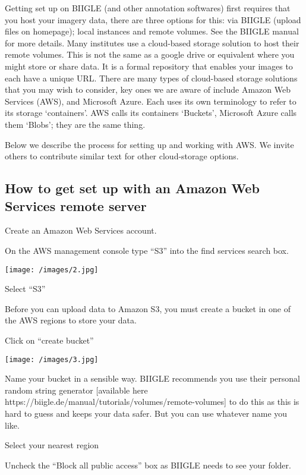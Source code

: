 \documentclass[
  letterpaper,
  DIV=11,
  numbers=noendperiod]{scrartcl}
\begin{document}
Getting set up on BIIGLE (and other annotation softwares) first requires
that you host your imagery data, there are three options for this: via
BIIGLE (upload files on homepage); local instances and remote volumes.
See the BIIGLE manual for more details. Many institutes use a
cloud-based storage solution to host their remote volumes. This is not
the same as a google drive or equivalent where you might store or share
data. It is a formal repository that enables your images to each have a
unique URL. There are many types of cloud-based storage solutions that
you may wish to consider, key ones we are aware of include Amazon Web
Services (AWS), and Microsoft Azure. Each uses its own terminology to
refer to its storage `containers'. AWS calls its containers `Buckets',
Microsoft Azure calls them `Blobs'; they are the same thing.

Below we describe the process for setting up and working with AWS. We
invite others to contribute similar text for other cloud-storage
options.

\hypertarget{how-to-get-set-up-with-an-amazon-web-services-remote-server}{%
\subsection{How to get set up with an Amazon Web Services remote
server}\label{how-to-get-set-up-with-an-amazon-web-services-remote-server}}

Create an Amazon Web Services account.

On the AWS management console type ``S3'' into the find services search
box.

\texttt{[image: /images/2.jpg]}

Select ``S3''

Before you can upload data to Amazon S3, you must create a bucket in one
of the AWS regions to store your data.

Click on ``create bucket''

\texttt{[image: /images/3.jpg]}

Name your bucket in a sensible way. BIIGLE recommends you use their
personal random string generator {[}available here
https://biigle.de/manual/tutorials/volumes/remote-volumes{]} to do this
as this is hard to guess and keeps your data safer. But you can use
whatever name you like.

Select your nearest region

Uncheck the ``Block all public access'' box as BIIGLE needs to see your
folder.
\end{document}
